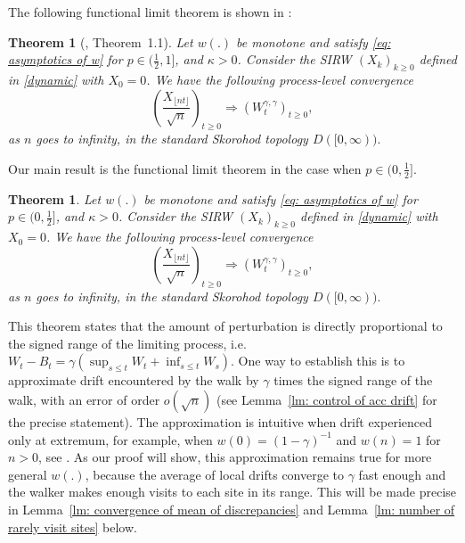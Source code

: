 \documentclass[twoside,12pt, a4paper]{article}
\newtheorem{theorem}{Theorem}[section]
\newtheorem*{theorem*}{Theorem}
\numberwithin{equation}{section}
\theoremstyle{remark}
\begin{document}
	\begin{samepage}
		The following functional limit theorem is shown in \cite{KMP23}: 
		\begin{theorem*}[\cite{KMP23}, Theorem~1.1]
			Let $w(.)$ be monotone and satisfy \eqref{eq: asymptotics of w} for $p\in (\frac{1}{2},1]$, and $\kappa >0 $. Consider the SIRW $(X_k)_{k\geq 0}$ defined in \eqref{dynamic} with $X_0 =0$. We have the following process-level convergence
			\[
			\left(  \frac{X_{\lfloor nt \rfloor }}{\sqrt{n}}  \right)_{t\geq 0} \Longrightarrow \left( W^{\gamma,\gamma}_{t}\right)_{t\geq 0},
			\] 
			as $n$ goes to infinity, in the standard Skorohod topology $D([0,\infty) ).$
		\end{theorem*}
	\end{samepage}
	\begin{samepage}
		Our main result is the functional limit theorem in the case when $p\in (0,\frac{1}{2}]$.
		\begin{theorem}\label{thm: main}
			Let $w(.)$ be monotone and satisfy \eqref{eq: asymptotics of w} for $p\in (0,\frac{1}{2}]$, and $\kappa >0 $. Consider the SIRW $(X_k)_{k\geq 0}$ defined in \eqref{dynamic} with $X_0 =0$. We have the following process-level convergence
			\[
			\left(  \frac{X_{\lfloor nt \rfloor }}{\sqrt{n}}  \right)_{t\geq 0} \Longrightarrow \left( W^{\gamma,\gamma}_{t}\right)_{t\geq 0},
			\]
			as $n$ goes to infinity, in the standard Skorohod topology $D([0,\infty) ).$
		\end{theorem}
	\end{samepage}
	
	This theorem states that the amount of perturbation is directly proportional to the signed range of the limiting process, i.e. $W_t - B_t = \gamma \left( \sup_{s \le t} W_t + \inf _{s \le t} W_s \right) $. 
	One way to establish this is to approximate drift encountered by the walk by $\gamma$ times the signed range of the walk, with an error of order $o\left(\sqrt{n} \right)$ (see Lemma~\ref{lm: control of acc drift} for the precise statement). 
	The approximation is intuitive when drift experienced only at extremum, for example, when $w(0) = (1 - \gamma)^{-1}$ and $w(n) = 1$ for $n > 0$, see \cite{Dav99}. 
	As our proof will show, this approximation remains true for more general $w(.)$, because the average of local drifts converge to $\gamma$ fast enough and the walker makes enough visits to each site in its range. 
	This will be made precise in Lemma~\ref{lm: convergence of mean of discrepancies} and Lemma~\ref{lm: number of rarely visit sites} below. 
	
\end{document}
